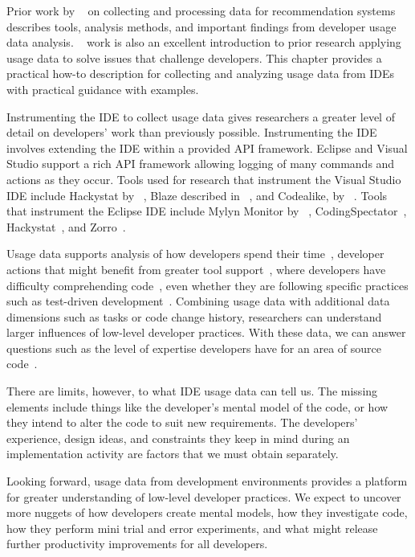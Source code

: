 \documentclass{book}
\begin{document}
Prior work by ~ on collecting and processing data for recommendation systems describes tools, analysis methods, and important findings from developer usage data analysis.  ~ work is also an excellent introduction to prior research applying usage data to solve issues that challenge developers.  This chapter provides a practical how-to description for collecting and analyzing usage data from IDEs with practical guidance with examples.  

Instrumenting the IDE to collect usage data gives researchers a greater level of detail on developers' work than previously possible. Instrumenting the IDE involves extending the IDE within a provided API framework.  Eclipse and Visual Studio support a rich API framework allowing logging of many commands and actions  as they occur.  Tools used for research that instrument the Visual Studio IDE include Hackystat by ~, Blaze described in  ~\cite {SnipesExperiencesGamifyingSoftwareDevelopment}, and Codealike, by ~.  Tools that instrument the Eclipse IDE include Mylyn Monitor by ~, CodingSpectator~\cite{VakilianETAL2012UseDisuseMisuse}, Hackystat~\cite{V:johnson2003beyond}, and Zorro~\cite{Kou2010Operational}.

Usage data supports analysis of how developers spend their time~\cite{V:johnson2003beyond}, developer actions that might benefit from greater tool support~\cite{V:MurphyHill2012How}, where developers have difficulty comprehending code~\cite{Carter2010Are}, even whether they are following specific practices such as test-driven development~\cite{Kou2010Operational}.  Combining usage data with additional data dimensions such as tasks or code change history, researchers can understand larger influences of low-level developer practices.  With these data, we can answer questions such as the level of expertise developers have for an area of source code~\cite{Fritz2010Degreeofknowledge}.

There are limits, however, to what IDE usage data can tell us.  The missing elements include things like  the developer's mental model of the code, or how they intend to alter the code to suit new requirements.  The developers' experience, design ideas, and constraints they keep in mind during an implementation activity are factors that we must obtain separately.  

Looking forward, usage data from development environments provides a platform for greater understanding of low-level developer practices.  We expect to uncover more nuggets of how developers create mental models, how they investigate code, how they perform mini trial and error experiments, and what might release further productivity improvements for all developers.
\end{document}
